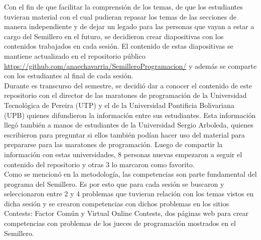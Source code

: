 \documentclass[conference]{IEEEtran}
\begin{document}
Con el fin de que facilitar la comprensión de los temas, de que los estudiantes tuvieran material con el cual pudieran repasar los temas de las secciones de manera independiente y de dejar un legado para las personas que vayan a estar a cargo del Semillero en el futuro, se decidieron crear diapositivas con los contenidos trabajados en cada sesión. El contenido de estas diapositivas se mantiene actualizado en el repositorio público \url{https://github.com/anaechavarria/SemilleroProgramacion/} y además se comparte con los estudiantes al final de cada sesión.\\
Durante es transcurso del semestre, se decidió dar a conocer el contenido de este repositorio con el director de las maratones de programación de la Universidad Tecnológica de Pereira (UTP) y el de la Universidad Pontificia Bolivariana (UPB) quienes difundieron la información entre sus estudiantes. Esta información llegó también a manos de estudiantes de la Universidad Sergio Arboleda, quienes escribieron para preguntar si ellos también podían hacer uso del material para prepararse para las maratones de programación. Luego de compartir la información con estas universidades, 8 personas nuevas empezaron a seguir el contenido del repositorio y otras 3 lo marcaron como favorito.\\

Como se mencionó en la metodología, las competencias son parte fundamental del programa del Semillero. Es por esto que para cada sesión se buscaron y seleccionaron entre 2 y 4 problemas que tuvieran relación con los temas vistos en dicha sesión y se crearon competencias con dichos problemas en los sitios Contests: Factor Común\cite{FactorComun} y Virtual Online Contests\cite{AhmedAly}, dos páginas web para crear competencias con problemas de los jueces de programación mostrados en el Semillero. 
\end{document}
